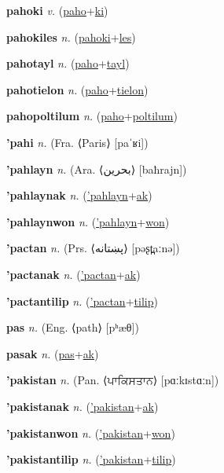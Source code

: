 \textbf{\hypertarget{pahoki}{pahoki}} \textit{v.} (\hyperlink{paho}{paho}+\allowbreak \hyperlink{ki}{ki})


\textbf{\hypertarget{pahokiles}{pahokiles}} \textit{n.} (\hyperlink{pahoki}{pahoki}+\allowbreak \hyperlink{les}{les})


\textbf{\hypertarget{pahotayl}{pahotayl}} \textit{n.} (\hyperlink{paho}{paho}+\allowbreak \hyperlink{tayl}{tayl})


\textbf{\hypertarget{pahotielon}{pahotielon}} \textit{n.} (\hyperlink{paho}{paho}+\allowbreak \hyperlink{tielon}{tielon})


\textbf{\hypertarget{pahopoltilum}{pahopoltilum}} \textit{n.} (\hyperlink{paho}{paho}+\allowbreak \hyperlink{poltilum}{poltilum})


\textbf{\hypertarget{'pahi}{'pahi}} \textit{n.} (Fra. ⟨Paris⟩ [paˈʁi])


\textbf{\hypertarget{'pahlayn}{'pahlayn}} \textit{n.} (Ara. ⟨{\arabics{}بحرين‎}⟩ [baħrajn])


\textbf{\hypertarget{'pahlaynak}{'pahlaynak}} \textit{n.} (\hyperlink{'pahlayn}{'pahlayn}+\allowbreak \hyperlink{ak}{ak})


\textbf{\hypertarget{'pahlaynwon}{'pahlaynwon}} \textit{n.} (\hyperlink{'pahlayn}{'pahlayn}+\allowbreak \hyperlink{won}{won})


\textbf{\hypertarget{'pactan}{'pactan}} \textit{n.} (Prs. ⟨{\arabics{}پښتانه‎‎}⟩ [pəʂt̪aːnə])


\textbf{\hypertarget{'pactanak}{'pactanak}} \textit{n.} (\hyperlink{'pactan}{'pactan}+\allowbreak \hyperlink{ak}{ak})


\textbf{\hypertarget{'pactantilip}{'pactantilip}} \textit{n.} (\hyperlink{'pactan}{'pactan}+\allowbreak \hyperlink{tilip}{tilip})


\textbf{\hypertarget{pas}{pas}} \textit{n.} (Eng. ⟨path⟩ [pʰæθ])


\textbf{\hypertarget{pasak}{pasak}} \textit{n.} (\hyperlink{pas}{pas}+\allowbreak \hyperlink{ak}{ak})


\textbf{\hypertarget{'pakistan}{'pakistan}} \textit{n.} (Pan. ⟨{\gurmukhi{}ਪਾਕਿਸਤਾਨ‎}⟩ [pɑːkɪstɑːn])


\textbf{\hypertarget{'pakistanak}{'pakistanak}} \textit{n.} (\hyperlink{'pakistan}{'pakistan}+\allowbreak \hyperlink{ak}{ak})


\textbf{\hypertarget{'pakistanwon}{'pakistanwon}} \textit{n.} (\hyperlink{'pakistan}{'pakistan}+\allowbreak \hyperlink{won}{won})


\textbf{\hypertarget{'pakistantilip}{'pakistantilip}} \textit{n.} (\hyperlink{'pakistan}{'pakistan}+\allowbreak \hyperlink{tilip}{tilip})


